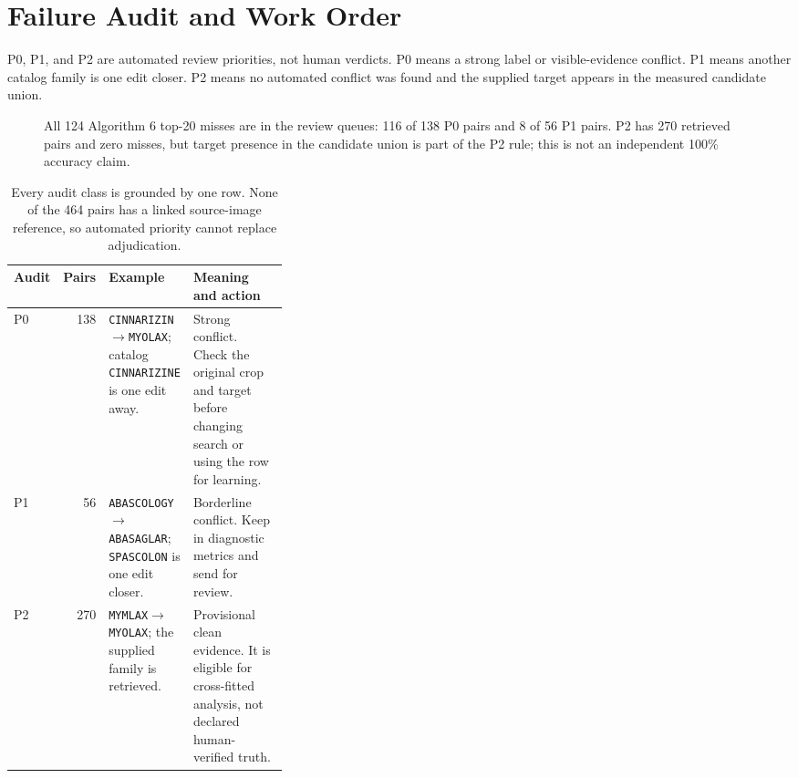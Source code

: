 \documentclass[11pt]{article}
\newcommand{\code}[1]{\texttt{#1}}
\begin{document}
\FloatBarrier
\section{Failure Audit and Work Order}

P0, P1, and P2 are automated review priorities, not human verdicts. P0 means a
strong label or visible-evidence conflict. P1 means another catalog family is
one edit closer. P2 means no automated conflict was found and the supplied
target appears in the measured candidate union.

\begin{figure}[htbp]
\centering
{}
\caption{All 124 Algorithm 6 top-20 misses are in the review queues: 116 of
138 P0 pairs and 8 of 56 P1 pairs. P2 has 270 retrieved pairs and zero misses,
but target presence in the candidate union is part of the P2 rule; this is not
an independent 100\% accuracy claim.}
\label{fig:audit}
\end{figure}

\begin{table}[H]
\centering
\small
\begin{tabularx}{\linewidth}{@{}L{0.08\linewidth}rL{0.27\linewidth}Y@{}}
\toprule
\textbf{Audit} & \textbf{Pairs} & \textbf{Example} & \textbf{Meaning and action} \\
\midrule
P0 & 138 & \code{CINNARIZIN}$\rightarrow$\code{MYOLAX}; catalog \code{CINNARIZINE} is one edit away. & Strong conflict. Check the original crop and target before changing search or using the row for learning. \\
P1 & 56 & \code{ABASCOLOGY}$\rightarrow$\code{ABASAGLAR}; \code{SPASCOLON} is one edit closer. & Borderline conflict. Keep in diagnostic metrics and send for review. \\
P2 & 270 & \code{MYMLAX}$\rightarrow$\code{MYOLAX}; the supplied family is retrieved. & Provisional clean evidence. It is eligible for cross-fitted analysis, not declared human-verified truth. \\
\bottomrule
\end{tabularx}
\caption{Every audit class is grounded by one row. None of the 464 pairs has a
linked source-image reference, so automated priority cannot replace adjudication.}
\label{tab:audit-examples}
\end{table}
\end{document}
